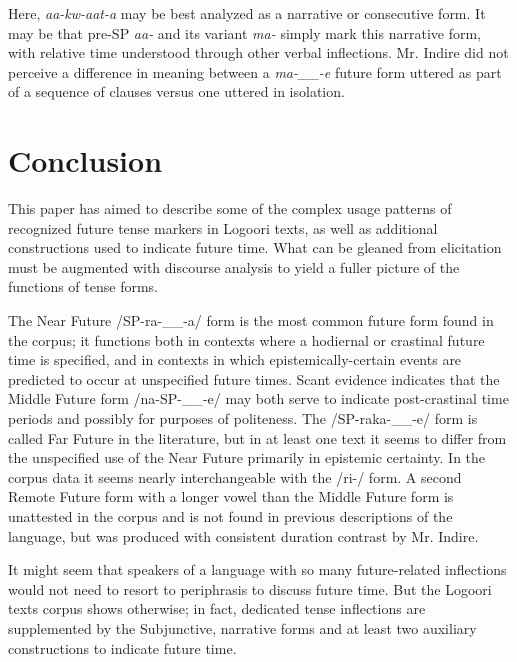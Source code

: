 \documentclass[output=paper]{langsci/langscibook}
\begin{document}
Here, \textit{aa-kw-aat-a }may be best analyzed as a narrative %
%
or consecutive form. It may be that pre-SP \textit{aa- }and its variant \textit{ma- }simply mark this narrative form, with relative time understood through other verbal inflections. Mr. Indire did not perceive a difference in meaning between a \textit{ma-\_\_-e }future form uttered as part of a sequence of clauses versus one uttered in isolation.

\section[Conclusion]{Conclusion} \label{sec:sarvasy:8}

This paper has aimed to describe some of the complex usage patterns of recognized future tense markers in Logoori texts, as well as additional constructions used to indicate future time. What can be gleaned from elicitation must be augmented with discourse analysis to yield a fuller picture of the functions of tense forms. 

The Near Future /SP-ra-\_\_-a/ form is the most common future form found in the corpus; it functions both in contexts where a hodiernal or crastinal future time is specified, and in contexts in which epistemically-certain events are predicted to occur at unspecified future times. Scant evidence indicates that the Middle Future form /na-SP-\_\_-e/ may both serve to indicate post-crastinal time periods and possibly for purposes of politeness. The /SP-raka-\_\_-e/ form is called Far Future in the literature, but in at least one text it seems to differ from the unspecified use of the Near Future primarily in epistemic certainty. In the corpus data it seems nearly interchangeable with the /ri-/ form. A second Remote Future form with a longer vowel than the Middle Future form is unattested in the corpus and is not found in previous descriptions of the language, but was produced with consistent duration contrast by Mr. Indire. 

It might seem that speakers of a language with so many future-related inflections would not need to resort to periphrasis to discuss future time. But the Logoori texts corpus shows otherwise; in fact, dedicated tense inflections are supplemented by the Subjunctive, narrative forms and at least two auxiliary constructions to indicate future time.
\end{document}
